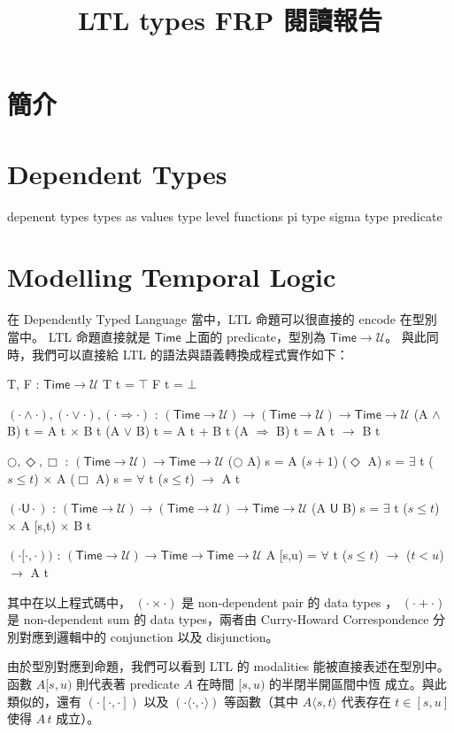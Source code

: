 \documentclass{article}
\newcommand{\U}{\mathcal{U}}
\begin{document}
\title{LTL types FRP 閱讀報告}
\author{}
\date{}
\maketitle

\newcommand{\Time}{\mathsf{Time}}

\section{簡介}
\section{Dependent Types}
  depenent types
  types as values
  type level functions
  pi type
  sigma type
  predicate

\section{Modelling Temporal Logic}
  在 Dependently Typed Language 當中，LTL 命題可以很直接的 encode 在型別
  當中。 LTL 命題直接就是 $\Time$ 上面的 predicate，型別為 $\Time\to\U$。
  與此同時，我們可以直接給 LTL 的語法與語義轉換成程式實作如下：

  \begin{code}
  T, F : $\Time\to\U$
  T t = $\top$
  F t = $\bot$

  $(\cdot\land\cdot), (\cdot\lor\cdot), (\cdot\Rightarrow\cdot)$ : $(\Time\to\U)\to(\Time\to\U)\to\Time\to\U$
  (A $\land$ B) t = A t $\times$ B t
  (A $\lor$ B) t = A t + B t
  (A $\Rightarrow$ B) t = A t $\to$ B t

  $\bigcirc,\Diamond,\Box$ : $(\Time\to\U)\to\Time\to\U$
  ($\bigcirc$ A) s = A ($s+1$)
  ($\Diamond$ A) s = $\exists$ {t} ($s\le t$) $\times$ A 
  ($\Box$ A) s = $\forall$ {t} ($s\le t$) $\to$ A t

  $(\cdot\mathsf{U}\cdot)$ : $(\Time\to\U)\to(\Time\to\U)\to\Time\to\U$
  (A $\mathsf{U}$ B) s = $\exists$ {t} ($s\le t$) $\times$ A [s,t) $\times$ B t

  $(\cdot[\cdot,\cdot))$ : $(\Time\to\U)\to\Time\to\Time\to\U$
  A [s,u) = $\forall$ {t} ($s\le t$) $\to$ ($t<u$) $\to$ A t
  \end{code}

  其中在以上程式碼中， $(\cdot\times\cdot)$ 是 non-dependent pair 的 data types
  ， $(\cdot+\cdot)$ 是 non-dependent sum 的 data types，兩者由 Curry-Howard
  Correspondence 分別對應到邏輯中的 conjunction 以及 disjunction。

  由於型別對應到命題，我們可以看到 LTL 的 modalities 能被直接表述在型別中。
  函數 $A [s,u)$ 則代表著 predicate $A$ 在時間 $[s,u)$ 的半閉半開區間中恆
  成立。與此類似的，還有 $(\cdot[\cdot,\cdot])$ 以及
  $(\cdot\langle\cdot,\cdot\rangle)$ 等函數（其中 $A\langle s,t\rangle$
  代表存在 $t\in [s,u]$ 使得 $A\,t$ 成立）。
\end{document}
